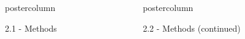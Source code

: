\documentclass{beamer}
\newlength{\columnheight}
\begin{document}
\begin{frame}
\begin{columns}
\begin{column}{.249\textwidth}
\begin{beamercolorbox}[center]{postercolumn}
\begin{minipage}{.98\textwidth}
{\begin{myblock}{2.1 - Methods}
\end{myblock}\vfill
					
					
		}\end{minipage}\end{beamercolorbox}
	\end{column}



\begin{column}{.499\textwidth}
	\begin{beamercolorbox}[center]{postercolumn}
		\begin{minipage}{.98\textwidth} %
				\parbox[t][\columnheight]{\textwidth}{ %
					
\begin{myblock}{2.2 - Methods (continued)}
	

							

\end{myblock}}
\end{minipage}
\end{beamercolorbox}
\end{column}
\end{columns}
\end{frame}
\end{document}
